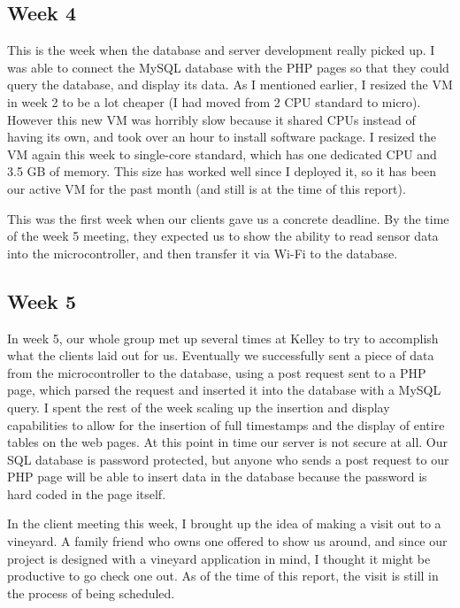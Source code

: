 \documentclass[IEEEtran,letterpaper,10pt,titlepage,fleqn,draftclsnofoot,onecolumn]{article}
\begin{document}
\subsection{Week 4}

This is the week when the database and server development really picked up. I was able to connect the MySQL database with the PHP pages so that they could query the database, and display its data. As I mentioned earlier, I resized the VM in week 2 to be a lot cheaper (I had moved from 2 CPU standard  to micro). However this new VM was horribly slow because it shared CPUs instead of having its own, and took over an hour to install software package. I resized the VM again this week to single-core standard, which has one dedicated CPU and 3.5 GB of memory. This size has worked well since I deployed it, so it has been our active VM for the past month (and still is at the time of this report). 

This was the first week when our clients gave us a concrete deadline. By the time of the week 5 meeting, they expected us to show the ability to read sensor data into the microcontroller, and then transfer it via Wi-Fi to the database.

\subsection{Week 5}

In week 5, our whole group met up several times at Kelley to try to accomplish what the clients laid out for us. Eventually we successfully sent a piece of data from the microcontroller to the database, using a post request sent to a PHP page, which parsed the request and inserted it into the database with a MySQL query. I spent the rest of the week scaling up the insertion and display capabilities to allow for the insertion of full timestamps and the display of entire tables on the web pages. At this point in time our server is not secure at all. Our SQL database is password protected, but anyone who sends a post request to our PHP page will be able to insert data in the database because the password is hard coded in the page itself. 

In the client meeting this week, I brought up the idea of making a visit out to a vineyard. A family friend who owns one offered to show us around, and since our project is designed with a vineyard application in mind, I thought it might be productive to go check one out. As of the time of this report, the visit is still in the process of being scheduled. 
\end{document}
